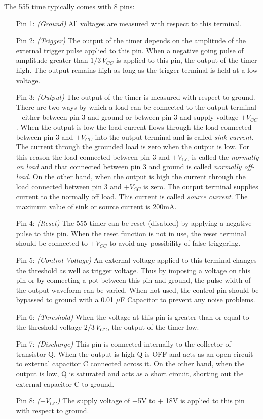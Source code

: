 The 555 time typically comes with 8 pins:
\begin{itemize}[itemsep=10pt]
    \item [Pin 1:] \textit{(Ground)} All voltages are measured with respect to this terminal.
    \item [Pin 2:] \textit{(Trigger)} The output of the timer depends on the amplitude of the external trigger pulse applied to this pin. When a negative going pulse of amplitude greater than $1/3\,V_{CC}$ is applied to this pin, the output of the timer high. The output remains high as long as the trigger terminal is held at a low voltage.
    \item [Pin 3:] \textit{(Output)} The output of the timer is measured with respect to ground. There are
    two ways by which a load can be connected to the output terminal -- either between pin 3
    and ground or between pin 3 and supply voltage $+V_{CC}$. When the output is low the load
    current flows through the load connected between pin 3 and $+V_{CC}$ into the output terminal
    and is called \textit{sink current}. The current through the grounded load is zero when the output
    is low. For this reason the load connected between pin 3 and $+V_{CC}$ is called the \textit{normally
    on load} and that connected between pin 3 and ground is
    called \textit{normally off-load}. On the other hand, when the output is high the current through
    the load connected between pin 3 and $+V_{CC}$ is zero. The output terminal supplies current to the normally off load. This current is called \textit{source current}. The maximum value of
    sink or source current is 200mA.
    \item [Pin 4:] \textit{(Reset)} The 555 timer can be reset (disabled) by applying a negative pulse to this
    pin. When the reset function is not in use, the reset terminal should be connected to $+V_{CC}$
    to avoid any possibility of false triggering.
    \item [Pin 5:] \textit{(Control Voltage)} An external voltage applied to this terminal changes the threshold
    as well as trigger voltage. Thus by imposing a voltage on this pin or by connecting a pot
    between this pin and ground, the pulse width of the output waveform can be varied.
    When not used, the control pin should be bypassed to ground with a 0.01 $\mu$F Capacitor to
    prevent any noise problems.
    \item [Pin 6:] \textit{(Threshold)} When the voltage at this pin is greater than or equal to the threshold
    voltage $2/3\,V_{CC}$, the output of the timer low.
    \item [Pin 7:] \textit{(Discharge)} This pin is connected internally to the collector of transistor Q. When
    the output is high Q is OFF and acts as an open circuit to external capacitor C connected
    across it. On the other hand, when the output is low, Q is saturated and acts as a short
    circuit, shorting out the external capacitor C to ground. 
    \item [Pin 8:] \textit{($+V_{CC}$)} The supply voltage of +5V to + 18V is applied to this pin with respect to
    ground.
\end{itemize}

